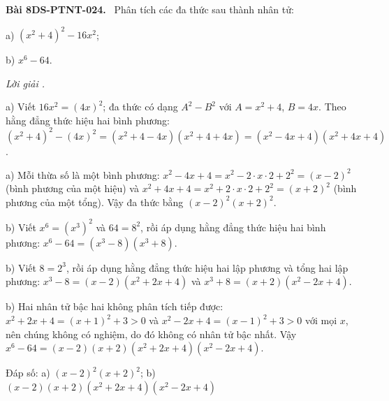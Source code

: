 \documentclass[12pt,a4paper]{article}
\newenvironment{problem}[1][]{\par\medskip\noindent\textbf{Bài #1.}\ }{\par}
\newenvironment{solution}[1][]{\par\noindent\textit{Lời giải #1.}\par}{\par}
\begin{document}
\begin{problem}[8DS-PTNT-024]
Phân tích các đa thức sau thành nhân tử:

a) $(x^2 + 4)^2 - 16x^2$;

b) $x^6 - 64$.

\begin{solution}
a) Viết $16x^2 = (4x)^2$; đa thức có dạng $A^2 - B^2$ với $A = x^2 + 4$, $B = 4x$. Theo hằng đẳng thức hiệu hai bình phương: $(x^2 + 4)^2 - (4x)^2 = (x^2 + 4 - 4x)(x^2 + 4 + 4x) = (x^2 - 4x + 4)(x^2 + 4x + 4)$.

a) Mỗi thừa số là một bình phương: $x^2 - 4x + 4 = x^2 - 2 \cdot x \cdot 2 + 2^2 = (x - 2)^2$ (bình phương của một hiệu) và $x^2 + 4x + 4 = x^2 + 2 \cdot x \cdot 2 + 2^2 = (x + 2)^2$ (bình phương của một tổng). Vậy đa thức bằng $(x - 2)^2(x + 2)^2$.

b) Viết $x^6 = (x^3)^2$ và $64 = 8^2$, rồi áp dụng hằng đẳng thức hiệu hai bình phương: $x^6 - 64 = (x^3 - 8)(x^3 + 8)$.

b) Viết $8 = 2^3$, rồi áp dụng hằng đẳng thức hiệu hai lập phương và tổng hai lập phương: $x^3 - 8 = (x - 2)(x^2 + 2x + 4)$ và $x^3 + 8 = (x + 2)(x^2 - 2x + 4)$.

b) Hai nhân tử bậc hai không phân tích tiếp được: $x^2 + 2x + 4 = (x + 1)^2 + 3 > 0$ và $x^2 - 2x + 4 = (x - 1)^2 + 3 > 0$ với mọi $x$, nên chúng không có nghiệm, do đó không có nhân tử bậc nhất. Vậy $x^6 - 64 = (x - 2)(x + 2)(x^2 + 2x + 4)(x^2 - 2x + 4)$.

Đáp số: a) $\boxed{(x - 2)^2(x + 2)^2}$; b) $\boxed{(x - 2)(x + 2)(x^2 + 2x + 4)(x^2 - 2x + 4)}$
\end{solution}
\end{problem}
\end{document}
